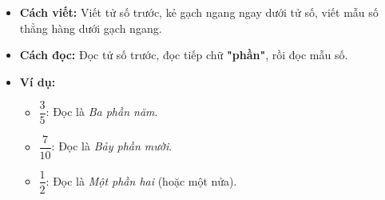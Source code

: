 \documentclass[14pt,a4paper,oneside]{extbook}
\begin{document}
\begin{minipage}[t]{0.49\textwidth}\vspace{0pt}
\begin{tcolorbox}[
  enhanced,
  colback=teal!4!white,
  colframe=teal!75!black,
  arc=2mm, boxrule=0.8pt,
  left=2mm, right=2mm, top=1.8mm, bottom=1.8mm,
  title={\footnotesize\bfseries\color{white}\faPencilSquareO\ 2. Quy tắc đọc và viết phân số}
]
{\footnotesize
\begin{itemize}\setlength{\itemsep}{1.5pt}\setlength{\leftskip}{-2.5mm}
  \item \textbf{Cách viết:} Viết tử số trước, kẻ gạch ngang ngay dưới tử số, viết mẫu số thẳng hàng dưới gạch ngang.
  \item \textbf{Cách đọc:} Đọc tử số trước, đọc tiếp chữ \textbf{"phần"}, rồi đọc mẫu số.
  \item \textbf{Ví dụ:}
  \begin{itemize}\setlength{\itemsep}{1pt}\setlength{\leftskip}{-2.5mm}
    \item $\dfrac{3}{5}$: Đọc là \textit{Ba phần năm}.
    \item $\dfrac{7}{10}$: Đọc là \textit{Bảy phần mười}.
    \item $\dfrac{1}{2}$: Đọc là \textit{Một phần hai} (hoặc một nửa).
  \end{itemize}
\end{itemize}
}
\end{tcolorbox}
\end{minipage}
\end{document}

